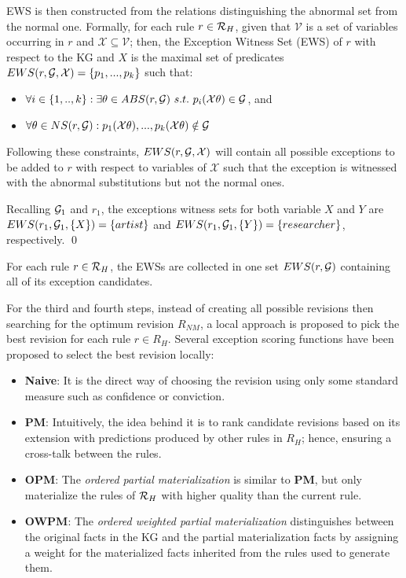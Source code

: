 EWS is then constructed from the relations distinguishing the abnormal set from the normal one. Formally, for each rule $r \in \mathcal{R}_H$, given that $\mathcal{V}$ is a set of variables occurring in $r$ and $\mathcal{X} \subseteq \mathcal{V}$; then, the Exception Witness Set (EWS) of $r$ with respect to the KG and $X$ is  the maximal set of predicates $EWS(r,\mathcal{G},\mathcal{X}) = \{p_1,...,p_k\}$ such that:
\begin{itemize}
\item $\forall i \in \{1,..,k\} : \exists \theta \in ABS(r, \mathcal{G})\ s.t.\ p_i(\mathcal{X}\theta) \in \mathcal{G}$, and 
\item $\forall \theta \in NS(r,\mathcal{G}) :  p_1(\mathcal{X}\theta), ...,p_k(\mathcal{X}\theta) \notin \mathcal{G}$
\end{itemize}

Following these constraints, $EWS(r,\mathcal{G},\mathcal{X})$ will contain all possible exceptions to be added to $r$ with respect to variables of $\mathcal{X}$ such that the exception is witnessed with the abnormal substitutions but not the normal ones.


\begin{example}
Recalling $\mathcal{G}_1$ and $r_1$, the exceptions witness sets for both variable $X$ and $Y$ are $EWS(r_1,\mathcal{G}_1,\{X\}) = \{artist\}$ and $EWS(r_1,\mathcal{G}_1,\{Y\}) = \{researcher\}$, respectively.
\qed
\end{example}
For each rule $r \in \mathcal{R}_H$, the EWSs are collected in one set $EWS(r,\mathcal{G})$ containing all of its exception candidates. 

For the third and fourth steps, instead of creating all possible revisions then searching for the optimum revision $R_{NM}$, a local approach is proposed to pick the best revision for each rule $r \in R_H$. Several exception scoring functions have been proposed to select the best revision locally:
\begin{itemize}
\item \textbf{Naive}: It is the direct way of choosing the revision using only some standard measure such as confidence or conviction.
\item \textbf{PM}: Intuitively, the idea behind it is to rank candidate revisions based on its extension with predictions produced by other rules in $R_H$; hence, ensuring a cross-talk between the rules.
\item \textbf{OPM}: The \textit{ordered partial materialization} is similar to \textbf{PM}, but only materialize the rules of $\mathcal{R}_{H}$ with higher quality than the current rule.
\item \textbf{OWPM}: The \textit{ordered weighted partial materialization} distinguishes between the original facts in the KG and the partial materialization facts by assigning a weight for the materialized facts inherited from the rules used to generate them. 
\end{itemize}

